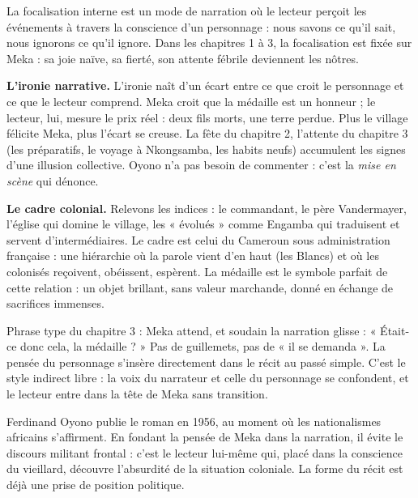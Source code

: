 \documentclass[11pt]{article}
\newcommand{\cle}[1]{{\popxbold\color{popdark}#1}}
\begin{document}
\begin{definition}
La \cle{focalisation interne} est un mode de narration où le lecteur perçoit les événements à travers la conscience d'un personnage : nous savons ce qu'il sait, nous ignorons ce qu'il ignore. Dans les chapitres 1 à 3, la focalisation est fixée sur \cle{Meka} : sa joie naïve, sa fierté, son attente fébrile deviennent les nôtres.
\end{definition}

\textbf{L'ironie narrative.} L'\cle{ironie} naît d'un écart entre ce que croit le personnage et ce que le lecteur comprend. Meka croit que la médaille est un honneur ; le lecteur, lui, mesure le prix réel : deux fils morts, une terre perdue. Plus le village félicite Meka, plus l'écart se creuse. La fête du chapitre 2, l'attente du chapitre 3 (les préparatifs, le voyage à Nkongsamba, les habits neufs) accumulent les signes d'une illusion collective. Oyono n'a pas besoin de commenter : c'est la \emph{mise en scène} qui dénonce.

\textbf{Le cadre colonial.} Relevons les indices : le commandant, le père Vandermayer, l'église qui domine le village, les « évolués » comme Engamba qui traduisent et servent d'intermédiaires. Le cadre est celui du Cameroun sous administration française : une hiérarchie où la parole vient d'en haut (les Blancs) et où les colonisés reçoivent, obéissent, espèrent. La médaille est le symbole parfait de cette relation : un objet brillant, sans valeur marchande, donné en échange de sacrifices immenses.

\begin{exemplebox}
Phrase type du chapitre 3 : Meka attend, et soudain la narration glisse : « Était-ce donc cela, la médaille ? » Pas de guillemets, pas de « il se demanda ». La pensée du personnage s'insère directement dans le récit au passé simple. C'est le \cle{style indirect libre} : la voix du narrateur et celle du personnage se confondent, et le lecteur entre dans la tête de Meka sans transition.
\end{exemplebox}

\begin{savaistu}
Ferdinand Oyono publie le roman en 1956, au moment où les nationalismes africains s'affirment. En fondant la pensée de Meka dans la narration, il évite le discours militant frontal : c'est le lecteur lui-même qui, placé dans la conscience du vieillard, découvre l'absurdité de la situation coloniale. La forme du récit est déjà une prise de position politique.
\end{savaistu}
\end{document}
